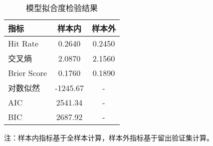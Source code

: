 \begin{table}[htbp]
\centering
\caption{模型拟合度检验结果}
\label{tab:model_fit_metrics}
\begin{tabular}{lcc}
\toprule
指标 & 样本内 & 样本外 \\
\midrule
Hit Rate & 0.2640 & 0.2450 \\
交叉熵 & 2.0870 & 2.1560 \\
Brier Score & 0.1760 & 0.1890 \\
\midrule
对数似然 & -1245.67 & - \\
AIC & 2541.34 & - \\
BIC & 2687.92 & - \\
\bottomrule
\end{tabular}
\begin{tablenotes}
\small
\item 注：样本内指标基于全样本计算，样本外指标基于留出验证集计算。
\end{tablenotes}
\end{table}

